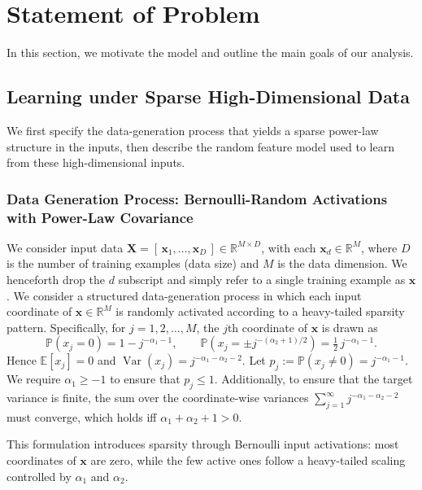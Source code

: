 \documentclass[11pt]{article}
\theoremstyle{plain}
\theoremstyle{definition}
\theoremstyle{remark}
\newcommand{\JSCheck}[1]{#1}
\begin{document}
\section{Statement of Problem}
In this section, we motivate the model and outline the main goals of our analysis.

\subsection{Learning under Sparse High-Dimensional Data}\label{Section:Ourmodel}
We first  specify the data-generation process that yields a sparse power-law structure in the inputs, then describe the random feature model used to learn from these high-dimensional inputs.



\subsubsection{Data Generation Process: Bernoulli-Random Activations with Power-Law Covariance}

We consider input data \(\mathbf{X} = [\,\mathbf{x}_1,\dots,\mathbf{x}_D\,] \in \mathbb{R}^{M\times D}\), with each \(\mathbf{x}_d  \in \mathbb{R}^{M}\), where $D$ is the number of training examples (data size) and $M$ is the data dimension. We henceforth drop the $d$ subscript and simply refer to a single training example as $\mathbf{x}$.  We consider a structured data-generation process in which each input coordinate of \(\mathbf{x}  \in \mathbb{R}^{M}\) is randomly activated according to a heavy-tailed sparsity pattern. Specifically, for \(j=1,2,\dots, M\), the \(j\)th coordinate of \(\mathbf{x}\) is drawn as
\begin{equation}
\mathbb{P}(x_j = 0) = 1 - j^{-\alpha_1 - 1}, \qquad\mathbb{P}\!\left(x_j = \pm j^{-(\alpha_2 + 1)/2}\right) 
= \tfrac{1}{2}\, j^{-\alpha_1 - 1}.
\label{eq:sparse-active-prob}
\end{equation}
Hence $\mathbb{E}[x_j] = 0$ and
$\operatorname{Var}(x_j) = j^{-\alpha_1 - \alpha_2 - 2}$.
Let \( p_j := \mathbb{P}(x_j \neq 0) = j^{-\alpha_1 - 1} \). We require \(\alpha_1 \geq -1\) to ensure that \(p_j \leq 1\). Additionally, to ensure that the \JSCheck{target} variance is finite, the sum over the coordinate-wise variances \(\sum_{j=1}^\infty j^{-\alpha_1 - \alpha_2 - 2}\) must converge, which holds iff \(\alpha_1 + \alpha_2 + 1 > 0\). 

This formulation introduces sparsity through Bernoulli input activations: most coordinates of \(\mathbf{x}\) are zero, while the few active ones follow a heavy-tailed scaling controlled by \(\alpha_1\) and \(\alpha_2\). 
\end{document}
